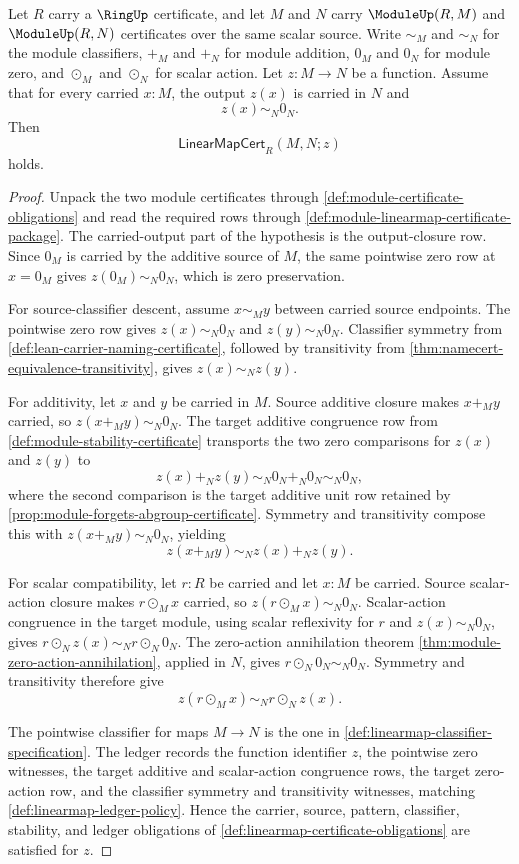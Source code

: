 \begin{theorem}
\label{thm:module-zero-linearmap-certificate}
Let $R$ carry a $\RingUp$ certificate, and let $M$ and $N$ carry $\ModuleUp(R,M)$ and $\ModuleUp(R,N)$ certificates over the same scalar source. Write $\sim_M$ and $\sim_N$ for the module classifiers, $+_M$ and $+_N$ for module addition, $0_M$ and $0_N$ for module zero, and $\odot_M$ and $\odot_N$ for scalar action. Let $z:M\to N$ be a function. Assume that for every carried $x:M$, the output $z(x)$ is carried in $N$ and
$$
z(x)\sim_N0_N.
$$
Then
$$
\mathsf{LinearMapCert}_R(M,N;z)
$$
holds.
\end{theorem}
\begin{proof}
Unpack the two module certificates through \autoref{def:module-certificate-obligations} and read the required rows through \autoref{def:module-linearmap-certificate-package}. The carried-output part of the hypothesis is the output-closure row. Since $0_M$ is carried by the additive source of $M$, the same pointwise zero row at $x=0_M$ gives $z(0_M)\sim_N0_N$, which is zero preservation.

For source-classifier descent, assume $x\sim_My$ between carried source endpoints. The pointwise zero row gives $z(x)\sim_N0_N$ and $z(y)\sim_N0_N$. Classifier symmetry from \autoref{def:lean-carrier-naming-certificate}, followed by transitivity from \autoref{thm:namecert-equivalence-transitivity}, gives $z(x)\sim_Nz(y)$.

For additivity, let $x$ and $y$ be carried in $M$. Source additive closure makes $x+_M y$ carried, so $z(x+_M y)\sim_N0_N$. The target additive congruence row from \autoref{def:module-stability-certificate} transports the two zero comparisons for $z(x)$ and $z(y)$ to
$$
z(x)+_N z(y)\sim_N0_N+_N0_N\sim_N0_N,
$$
where the second comparison is the target additive unit row retained by \autoref{prop:module-forgets-abgroup-certificate}. Symmetry and transitivity compose this with $z(x+_M y)\sim_N0_N$, yielding
$$
z(x+_M y)\sim_N z(x)+_N z(y).
$$

For scalar compatibility, let $r:R$ be carried and let $x:M$ be carried. Source scalar-action closure makes $r\odot_M x$ carried, so $z(r\odot_M x)\sim_N0_N$. Scalar-action congruence in the target module, using scalar reflexivity for $r$ and $z(x)\sim_N0_N$, gives $r\odot_N z(x)\sim_N r\odot_N0_N$. The zero-action annihilation theorem \autoref{thm:module-zero-action-annihilation}, applied in $N$, gives $r\odot_N0_N\sim_N0_N$. Symmetry and transitivity therefore give
$$
z(r\odot_M x)\sim_N r\odot_N z(x).
$$

The pointwise classifier for maps $M\to N$ is the one in \autoref{def:linearmap-classifier-specification}. The ledger records the function identifier $z$, the pointwise zero witnesses, the target additive and scalar-action congruence rows, the target zero-action row, and the classifier symmetry and transitivity witnesses, matching \autoref{def:linearmap-ledger-policy}. Hence the carrier, source, pattern, classifier, stability, and ledger obligations of \autoref{def:linearmap-certificate-obligations} are satisfied for $z$.
\end{proof}

